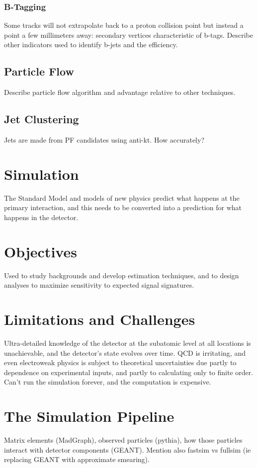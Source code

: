     \subsubsection{B-Tagging} \label{sec:btagging}

    Some tracks will not extrapolate back to a proton collision point but instead a point a few millimeters away: secondary vertices characteristic of b-tags.
    Describe other indicators used to identify b-jets and the efficiency.

  \subsection{Particle Flow} \label{sec:particleflow}

  Describe particle flow algorithm and advantage relative to other techniques.

  \subsection{Jet Clustering} \label{sec:jetclustering}

  Jets are made from PF candidates using anti-kt.
  How accurately?

\section{Simulation} \label{sec:simulation}

  The Standard Model and models of new physics predict what happens at the primary interaction, and this needs to be converted into a prediction for what happens in the detector.

  \section{Objectives} \label{sec:objectives}

  Used to study backgrounds and develop estimation techniques, and to design analyses to maximize sensitivity to expected signal signatures.

  \section{Limitations and Challenges} \label{sec:limitations}

  Ultra-detailed knowledge of the detector at the subatomic level at all locations is unachievable, and the detector's state evolves over time.
  QCD is irritating, and even electroweak physics is subject to theoretical uncertainties due partly to dependence on experimental inputs, and partly to calculating only to finite order.
  Can't run the simulation forever, and the computation is expensive.

  \section{The Simulation Pipeline} \label{sec:pipeline}

  Matrix elements (MadGraph), observed particles (pythia), how those particles interact with detector components (GEANT).
  Mention also fastsim vs fullsim (ie replacing GEANT with approximate smearing).
